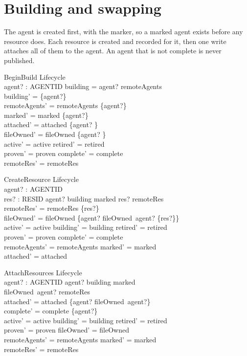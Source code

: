 \documentclass[a4paper,10pt,fleqn]{article}
\begin{document}
\section{Building and swapping}

The agent is created first, with the marker, so a marked agent exists before
any resource does. Each resource is created and recorded for it, then one
write attaches all of them to the agent. An agent that is not complete is
never published.

\begin{schema}{BeginBuild}
  \Delta Lifecycle \\
  agent? : AGENTID
\where
  building = \emptyset \land agent? \notin remoteAgents \\
  building' = \{agent?\} \\
  remoteAgents' = remoteAgents \cup \{agent?\} \\
  marked' = marked \cup \{agent?\} \\
  attached' = attached \cup \{agent? \mapsto \emptyset\} \\
  fileOwned' = fileOwned \cup \{agent? \mapsto \emptyset\} \\
  active' = active \land retired' = retired \\
  proven' = proven \land complete' = complete \\
  remoteRes' = remoteRes
\end{schema}

\begin{schema}{CreateResource}
  \Delta Lifecycle \\
  agent? : AGENTID \\
  res? : RESID
\where
  agent? \in building \cap marked \land res? \notin remoteRes \\
  remoteRes' = remoteRes \cup \{res?\} \\
  fileOwned' = fileOwned \oplus
    \{agent? \mapsto fileOwned~agent? \cup \{res?\}\} \\
  active' = active \land building' = building \land retired' = retired \\
  proven' = proven \land complete' = complete \\
  remoteAgents' = remoteAgents \land marked' = marked \\
  attached' = attached
\end{schema}

\begin{schema}{AttachResources}
  \Delta Lifecycle \\
  agent? : AGENTID
\where
  agent? \in building \cap marked \\
  fileOwned~agent? \subseteq remoteRes \\
  attached' = attached \oplus \{agent? \mapsto fileOwned~agent?\} \\
  complete' = complete \cup \{agent?\} \\
  active' = active \land building' = building \land retired' = retired \\
  proven' = proven \land fileOwned' = fileOwned \\
  remoteAgents' = remoteAgents \land marked' = marked \\
  remoteRes' = remoteRes
\end{schema}
\end{document}
